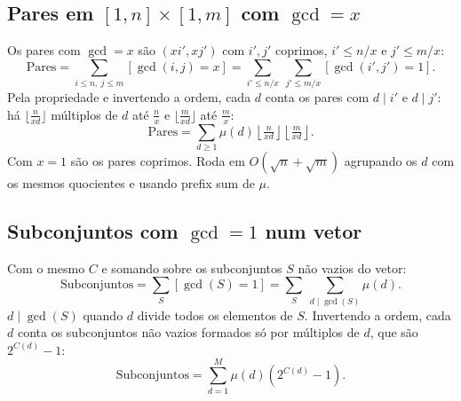 \subsection*{Pares em $[1, n] \times [1, m]$ com $\gcd = x$}

Os pares com $\gcd = x$ são $(x i', x j')$ com $i', j'$ coprimos, $i' \le n/x$ e $j' \le m/x$:
\[ \text{Pares} = \sum_{i \le n,\ j \le m} [\gcd(i, j) = x] = \sum_{i' \le n/x} \ \sum_{j' \le m/x} [\gcd(i', j') = 1]. \]
Pela propriedade e invertendo a ordem, cada $d$ conta os pares com $d \mid i'$ e $d \mid j'$: há
$\lfloor \frac{n}{xd} \rfloor$ múltiplos de $d$ até $\frac{n}{x}$ e $\lfloor \frac{m}{xd} \rfloor$ até $\frac{m}{x}$:
\[ \text{Pares} = \sum_{d \ge 1} \mu(d) \left\lfloor \tfrac{n}{xd} \right\rfloor \left\lfloor \tfrac{m}{xd} \right\rfloor. \]
Com $x = 1$ são os pares coprimos. Roda em $O(\sqrt{n} + \sqrt{m})$ agrupando os $d$ com os mesmos quocientes e usando prefix sum de $\mu$.

\subsection*{Subconjuntos com $\gcd = 1$ num vetor}

Com o mesmo $C$ e somando sobre os subconjuntos $S$ não vazios do vetor:
\[ \text{Subconjuntos} = \sum_{S} [\gcd(S) = 1] = \sum_{S} \ \sum_{d \mid \gcd(S)} \mu(d). \]
$d \mid \gcd(S)$ quando $d$ divide todos os elementos de $S$. Invertendo a ordem, cada $d$ conta os subconjuntos não vazios
formados só por múltiplos de $d$, que são $2^{C(d)} - 1$:
\[ \text{Subconjuntos} = \sum_{d = 1}^{M} \mu(d) \left(2^{C(d)} - 1\right). \]
